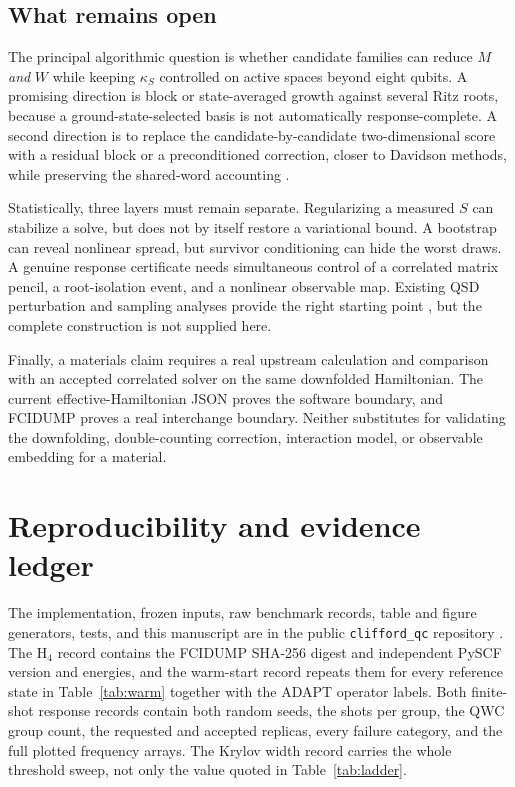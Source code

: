 \documentclass[aps,pra,reprint,superscriptaddress,nofootinbib,floatfix]{revtex4-2}
\begin{document}
\subsection{What remains open}
\label{sec:open}

The principal algorithmic question is whether candidate families can reduce
$M$ \emph{and} $W$ while keeping $\kappa_S$ controlled on active spaces beyond
eight qubits.  A promising direction is block or state-averaged growth against
several Ritz roots, because a ground-state-selected basis is not automatically
response-complete.  A second direction is to replace the candidate-by-candidate
two-dimensional score with a residual block or a preconditioned correction,
closer to Davidson methods, while preserving the shared-word accounting
\cite{tkachenko2024davidson}.

Statistically, three layers must remain separate.  Regularizing a measured
$S$ can stabilize a solve, but does not by itself restore a variational bound.
A bootstrap can reveal nonlinear spread, but survivor conditioning can hide
the worst draws.  A genuine response certificate needs simultaneous control
of a correlated matrix pencil, a root-isolation event, and a nonlinear
observable map.  Existing QSD perturbation and sampling analyses provide the
right starting point \cite{epperly2022theory,lee2024sampling}, but the complete
construction is not supplied here.

Finally, a materials claim requires a real upstream calculation and comparison
with an accepted correlated solver on the same downfolded Hamiltonian.  The
current effective-Hamiltonian JSON proves the software boundary, and FCIDUMP
proves a real interchange boundary.  Neither substitutes for validating the
downfolding, double-counting correction, interaction model, or observable
embedding for a material.

\section{Reproducibility and evidence ledger}
\label{sec:reproducibility}

The implementation, frozen inputs, raw benchmark records, table and figure
generators, tests, and this manuscript are in the public
\texttt{clifford\_qc} repository \cite{cliffordqc2026}.  The H$_4$ record
contains the FCIDUMP SHA-256 digest and independent PySCF version and energies,
and the warm-start record repeats them for every reference state in
Table~\ref{tab:warm} together with the ADAPT operator labels.  Both finite-shot
response records contain both random seeds, the shots per group, the QWC group
count, the requested and accepted replicas, every failure category, and the
full plotted frequency arrays.  The Krylov width record carries the whole
threshold sweep, not only the value quoted in Table~\ref{tab:ladder}.
\end{document}
